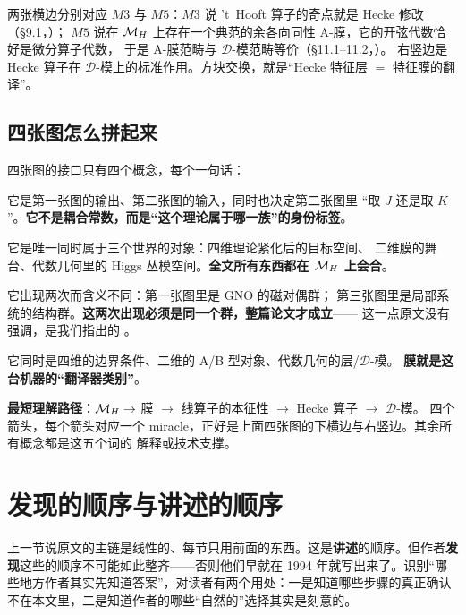 两张横边分别对应 $M3$ 与 $M5$：$M3$ 说 't~Hooft 算子的奇点就是 Hecke 修改（\S9.1，）；
$M5$ 说在 $\MH$ 上存在一个典范的余各向同性 A-膜，它的开弦代数恰好是微分算子代数，
于是 A-膜范畴与 $\mathcal{D}$-模范畴等价（\S11.1--11.2，）。
右竖边是 Hecke 算子在 $\mathcal{D}$-模上的标准作用。方块交换，就是“Hecke 特征层 $=$ 特征膜的翻译”。

\subsection{四张图怎么拼起来}

四张图的接口只有四个概念，每个一句话：

\begin{description}[leftmargin=1.6em]
\item[$\Psi$（在第一张与第二张之间）。] 它是第一张图的输出、第二张图的输入，同时也决定第二张图里
“取 $J$ 还是取 $K$”。\textbf{它不是耦合常数，而是“这个理论属于哪一族”的身份标签}。
\item[$\MH$（在第二张与第三、四章之间）。] 它是唯一同时属于三个世界的对象：四维理论紧化后的目标空间、
二维膜的舞台、代数几何里的 Higgs 丛模空间。\textbf{全文所有东西都在 $\MH$ 上会合}。
\item[$\Ldual$（在第一、二、三章之间）。] 它出现两次而含义不同：第一张图里是 GNO 的磁对偶群；
第三张图里是局部系统的结构群。\textbf{这两次出现必须是同一个群，整篇论文才成立}——
这一点原文没有强调，是我们指出的 \pC。
\item[膜（贯穿后三张图）。] 它同时是四维的边界条件、二维的 A/B 型对象、代数几何的层/$\mathcal{D}$-模。
\textbf{膜就是这台机器的“翻译器类别”}。
\end{description}

\begin{keyidea}
\textbf{最短理解路径}：$\mathcal{M}_H\to$ 膜 $\to$ 线算子的本征性 $\to$ Hecke 算子 $\to$ $\mathcal{D}$-模。
四个箭头，每个箭头对应一个 miracle，正好是上面四张图的下横边与右竖边。其余所有概念都是这五个词的
解释或技术支撑。
\end{keyidea}

\section{发现的顺序与讲述的顺序}\label{sec:discovery}

上一节说原文的主链是线性的、每节只用前面的东西。这是\textbf{讲述}的顺序。但作者\textbf{发现}这些的顺序不可能如此整齐——否则他们早就在 1994 年就写出来了。识别“哪些地方作者其实先知道答案”，对读者有两个用处：一是知道哪些步骤的真正确认不在本文里，二是知道作者的哪些“自然的”选择其实是刻意的。

